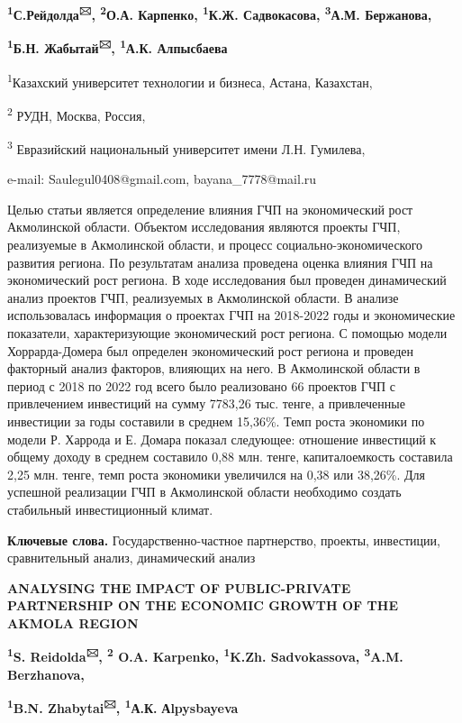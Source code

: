 {\bfseries \textsuperscript{1}С.Рейдолда\textsuperscript{🖂},
\textsuperscript{2}О.А. Карпенко, \textsuperscript{1}К.Ж. Садвокасова,
\textsuperscript{3}А.М. Бержанова,}

{\bfseries \textsuperscript{1}Б.Н. Жабытай\textsuperscript{🖂},
\textsuperscript{1}А.К. Алпысбаева}

\textsuperscript{1}Казахский университет технологии и бизнеса, Астана,
Казахстан,

\textsuperscript{2} РУДН, Москва, Россия,

\textsuperscript{3} Евразийский национальный университет имени Л.Н.
Гумилева,

e-mail: Saulegul0408@gmail.com, bayana\_7778@mail.ru

Целью статьи является определение влияния ГЧП на экономический рост
Акмолинской области. Объектом исследования являются проекты ГЧП,
реализуемые в Акмолинской области, и процесс социально-экономического
развития региона. По результатам анализа проведена оценка влияния ГЧП на
экономический рост региона. В ходе исследования был проведен
динамический анализ проектов ГЧП, реализуемых в Акмолинской области. В
анализе использовалась информация о проектах ГЧП на 2018-2022 годы и
экономические показатели, характеризующие экономический рост региона. С
помощью модели Хоррарда-Домера был определен экономический рост региона
и проведен факторный анализ факторов, влияющих на него. В Акмолинской
области в период с 2018 по 2022 год всего было реализовано 66 проектов
ГЧП с привлечением инвестиций на сумму 7783,26 тыс. тенге, а
привлеченные инвестиции за годы составили в среднем 15,36\%. Темп роста
экономики по модели Р. Харрода и Е. Домара показал следующее: отношение
инвестиций к общему доходу в среднем составило 0,88 млн. тенге,
капиталоемкость составила 2,25 млн. тенге, темп роста экономики
увеличился на 0,38 или 38,26\%. Для успешной реализации ГЧП в
Акмолинской области необходимо создать стабильный инвестиционный климат.

{\bfseries Ключевые слова.} Государственно-частное партнерство, проекты,
инвестиции, сравнительный анализ, динамический анализ

{\bfseries ANALYSING THE IMPACT OF PUBLIC-PRIVATE PARTNERSHIP ON THE
ECONOMIC GROWTH OF THE AKMOLA REGION}

{\bfseries \textsuperscript{1}S. Reidolda\textsuperscript{🖂},
\textsuperscript{2} O.A. Karpenko, \textsuperscript{1}K.Zh.
Sadvokassova, \textsuperscript{3}A.M. Berzhanova,}

{\bfseries \textsuperscript{1}B.N. Zhabytai\textsuperscript{🖂},
\textsuperscript{1}А.К.} {\bfseries Аlpysbayeva}

